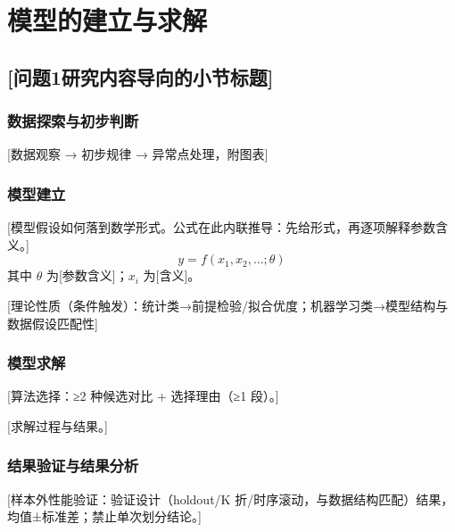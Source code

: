 \documentclass[12pt,a4paper]{ctexart}
\begin{document}
\section{模型的建立与求解}

\subsection{[问题1研究内容导向的小节标题]}

\subsubsection{数据探索与初步判断}

[数据观察 → 初步规律 → 异常点处理，附图表]

\subsubsection{模型建立}

[模型假设如何落到数学形式。公式在此内联推导：先给形式，再逐项解释参数含义。]
\begin{equation}
y = f(x_1, x_2, \ldots; \theta)
\end{equation}
其中 $\theta$ 为[参数含义]；$x_i$ 为[含义]。

[理论性质（条件触发）：统计类→前提检验/拟合优度；机器学习类→模型结构与数据假设匹配性]

\subsubsection{模型求解}

[算法选择：≥2 种候选对比 + 选择理由（≥1 段）。]

[求解过程与结果。]

\subsubsection{结果验证与结果分析}

[样本外性能验证：验证设计（holdout/K 折/时序滚动，与数据结构匹配）结果，
均值±标准差；禁止单次划分结论。]
\end{document}
